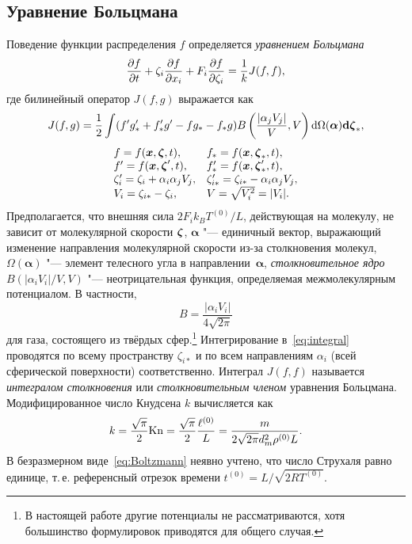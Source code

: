 \subsection{Уравнение Больцмана}

Поведение функции распределения \(f\) определяется \emph{уравнением Больцмана}
\begin{equation}\label{eq:Boltzmann}
    \pder[f]{t} + \zeta_i\pder[f]{x_i} + F_i\pder[f]{\zeta_i} = \frac1k J(f,f),
\end{equation}
где билинейный оператор \(J(f,g)\) выражается как
\begin{equation}\label{eq:integral}
    J(f,g) = \frac12 \int(f'g'_*+f'_*g'-fg_*-f_*g) B\left(\frac{|\alpha_j V_j|}{V},V\right)
        \dd\Omega(\boldsymbol\alpha)\dzeta_*,
\end{equation}
\begin{equation*}
    \begin{array}{l l}
        f = f(\bx,\bzeta,t), & f_* = f(\bx,\bzeta_*,t), \\
        f' = f(\bx,\bzeta',t), & f'_* = f(\bx,\bzeta'_*,t), \\
        \zeta_i' = \zeta_i+\alpha_i\alpha_j V_j, & \zeta_{i*}' = \zeta_{i*}-\alpha_i\alpha_j V_j, \\
        V_i = \zeta_{i*}-\zeta_i, & V = \sqrt{V_i^2} = |V_i|.
    \end{array}
\end{equation*}
Предполагается, что внешняя сила \(2F_i k_B T^{(0)}/L\), действующая на молекулу,
не зависит от молекулярной скорости \(\bzeta\),
\(\boldsymbol\alpha\) "--- единичный вектор,
выражающий изменение направления молекулярной скорости из-за столкновения молекул,
\(\Omega(\boldsymbol\alpha)\) "--- элемент телесного угла в направлении~\(\boldsymbol\alpha\),
\emph{столкновительное ядро} \(B(|\alpha_i V_i|/V,V)\) "--- неотрицательная функция,
определяемая межмолекулярным потенциалом. В частности,
\begin{equation}\label{eq:ci_kernel}
    B = \frac{|\alpha_i V_i|}{4\sqrt{2\pi}}
\end{equation}
для газа, состоящего из твёрдых сфер.\footnote{
    В настоящей работе другие потенциалы не рассматриваются,
    хотя большинство формулировок приводятся для общего случая.
}
Интегрирование в~\eqref{eq:integral} проводятся по всему пространству \(\zeta_{i*}\) и
по всем направлениям \(\alpha_i\) (всей сферической поверхности) соответственно.
Интеграл \(J(f,f)\) называется \emph{интегралом столкновения}
или \emph{столкновительным членом} уравнения Больцмана.
Модифицированное число Кнудсена \(k\) вычисляется как
\begin{equation}\label{eq:modified_kn}
    k = \frac{\sqrt\pi}2\Kn = \frac{\sqrt\pi}2 \frac{\ell^{(0)}}L = \frac{m}{2\sqrt{2\pi} d_m^2 \rho^{(0)}L}.
\end{equation}
В безразмерном виде~\eqref{eq:Boltzmann} неявно учтено, что число Струхаля равно единице,
т.\,е. референсный отрезок времени \(t^{(0)} = L/\sqrt{2RT^{(0)}}\).

